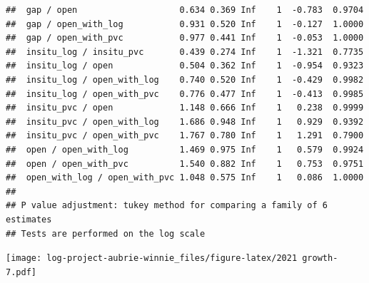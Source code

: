 \documentclass[
]{article}
\newenvironment{Shaded}{\begin{snugshade}}{\end{snugshade}}
\newcommand{\AttributeTok}[1]{\textcolor[rgb]{0.13,0.29,0.53}{#1}}
\newcommand{\ConstantTok}[1]{\textcolor[rgb]{0.56,0.35,0.01}{#1}}
\newcommand{\DecValTok}[1]{\textcolor[rgb]{0.00,0.00,0.81}{#1}}
\newcommand{\DocumentationTok}[1]{\textcolor[rgb]{0.56,0.35,0.01}{\textbf{\textit{#1}}}}
\newcommand{\FunctionTok}[1]{\textcolor[rgb]{0.13,0.29,0.53}{\textbf{#1}}}
\newcommand{\NormalTok}[1]{#1}
\newcommand{\OtherTok}[1]{\textcolor[rgb]{0.56,0.35,0.01}{#1}}
\newcommand{\SpecialCharTok}[1]{\textcolor[rgb]{0.81,0.36,0.00}{\textbf{#1}}}
\newcommand{\StringTok}[1]{\textcolor[rgb]{0.31,0.60,0.02}{#1}}
\begin{document}
\begin{verbatim}
##  gap / open                    0.634 0.369 Inf    1  -0.783  0.9704
##  gap / open_with_log           0.931 0.520 Inf    1  -0.127  1.0000
##  gap / open_with_pvc           0.977 0.441 Inf    1  -0.053  1.0000
##  insitu_log / insitu_pvc       0.439 0.274 Inf    1  -1.321  0.7735
##  insitu_log / open             0.504 0.362 Inf    1  -0.954  0.9323
##  insitu_log / open_with_log    0.740 0.520 Inf    1  -0.429  0.9982
##  insitu_log / open_with_pvc    0.776 0.477 Inf    1  -0.413  0.9985
##  insitu_pvc / open             1.148 0.666 Inf    1   0.238  0.9999
##  insitu_pvc / open_with_log    1.686 0.948 Inf    1   0.929  0.9392
##  insitu_pvc / open_with_pvc    1.767 0.780 Inf    1   1.291  0.7900
##  open / open_with_log          1.469 0.975 Inf    1   0.579  0.9924
##  open / open_with_pvc          1.540 0.882 Inf    1   0.753  0.9751
##  open_with_log / open_with_pvc 1.048 0.575 Inf    1   0.086  1.0000
## 
## P value adjustment: tukey method for comparing a family of 6 estimates 
## Tests are performed on the log scale
\end{verbatim}

\begin{Shaded}
\end{Shaded}

\texttt{[image: log-project-aubrie-winnie\_files/figure-latex/2021 growth-7.pdf]}
\end{document}
